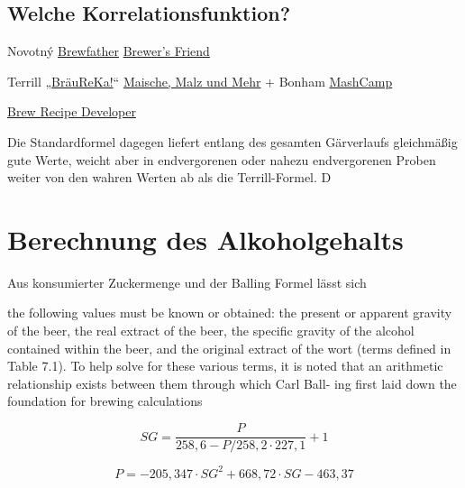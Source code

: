\documentclass[a4paper,parskip=half]{scrartcl}
\newcommand{\sg}{\mathit{SG}}
\begin{document}

\subsection*{Welche Korrelationsfunktion?}

Novotný
\href{https://brewfather.app}{Brewfather}
\href{https://www.brewersfriend.com/refractometer-calculator}{Brewer's Friend}

Terrill
„\href{https://braureka.de/berechnungen/refraktometer-korrektur/}{BräuReKa!}“
\href{https://www.maischemalzundmehr.de/index.php?inhaltmitte=toolsrefraktorechner}{Maische, Malz und Mehr} + Bonham
\href{https://mashcamp.shop/brauberechnungen}{MashCamp}

\href{http://www.brewrecipedeveloper.de}{Brew Recipe Developer}

Die Standardformel dagegen liefert entlang des gesamten Gärverlaufs gleichmäßig gute Werte, weicht aber in endvergorenen oder nahezu endvergorenen Proben weiter von den wahren Werten ab als die Terrill-Formel. D
\autocite{Weiss2016}

\section*{Berechnung des Alkoholgehalts}

Aus konsumierter Zuckermenge und der Balling Formel lässt sich

the following values must be known or
obtained: the present or apparent gravity of the beer, the real extract of the beer,
the specific gravity of the alcohol contained within the beer, and the original extract
of the wort (terms defined in Table 7.1). To help solve for these various terms, it is
noted that an arithmetic relationship exists between them through which Carl Ball-
ing first laid down the foundation for brewing calculations

\begin{equation}
\sg = \frac{P}{258,6 - \mathit{P} / 258,2 \cdot 227,1} + 1
\end{equation}

\begin{equation}
P = -205,347 \cdot \sg^2 + 668,72 \cdot \sg - 463,37
\end{equation}
\end{document}
